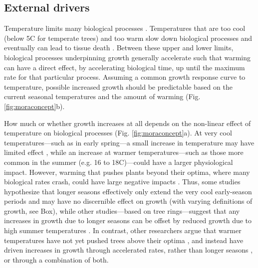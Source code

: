 \documentclass[11pt]{article}
\newcommand{\R}[1]{\label{#1}\linelabel{#1}}
\begin{document}
\subsection*{External drivers}

Temperature limits many biological processes \citep{korner2015paradigm}\R{forbigK}. Temperatures that are too cool (below 5\degree C for temperate trees) and too warm \citep[an area of active research, but likely between 35-45\degree C;][]{martinez2008hot,cabon2022cross} slow down biological processes and eventually can lead to tissue death \R{morebox}\citep[see Fig. \ref{fig:moraconcept}a, Box,][]{larcher1980,kramer2012book}. Between these upper and lower limits, biological processes underpinning growth generally accelerate such that warming can have a direct effect, by accelerating biological time, up until the maximum rate for that particular process. Assuming a common growth response curve to temperature, possible increased growth should be predictable based on the current seasonal temperatures and the amount of warming (Fig. \ref{fig:moraconcept}b). 

How much or whether growth increases at all depends on the non-linear effect of temperature on biological processes (Fig. \ref{fig:moraconcept}a). At very cool temperatures---such as in early spring---a small increase in temperature may have limited effect \citep[or even increase frost risk through early budburst, Fig. \ref{fig:hypotheses}e,][]{cat2021pep}, while an increase at warmer temperatures---such as those more common in the summer (e.g. 16 to 18\degree C)---could have a larger physiological impact. However, warming that pushes plants beyond their optima, where many biological rates crash, could have large negative impacts \citep{nobel1983biophysical,leuning2002temperature}. Thus, some studies hypothesize that longer seasons effectively only extend the very cool early-season periods and may have no discernible effect on growth (with varying definitions of growth, see Box), while other studies---based on tree rings---suggest that any increases in growth due to longer seasons can be offset by reduced growth due to high summer temperatures \citep[Fig. \ref{fig:hypotheses},][]{gantois2022new,dow2022warm}. In contrast, other researchers argue that warmer temperatures have not yet pushed trees above their optima \citep{schaber2002evaluation}, and instead have driven increases in growth through accelerated rates, rather than longer seasons \citep[e.g.][]{ren2019}, or through a combination of both.
\end{document}
